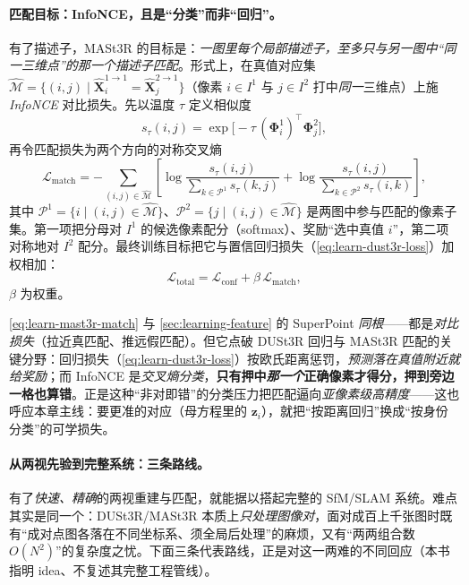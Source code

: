 \paragraph{匹配目标：InfoNCE，且是“分类”而非“回归”。}
有了描述子，MASt3R 的目标是：\emph{一图里每个局部描述子，至多只与另一图中“同一三维点”的那\emph{一个}描述子匹配}。形式上，在真值对应集 $\hat{\mathcal{M}}=\{(i,j)\mid \hat{\mathbf{X}}^{1\to1}_i=\hat{\mathbf{X}}^{2\to1}_j\}$（像素 $i\in I^1$ 与 $j\in I^2$ 打中\emph{同一}三维点）上施 \emph{InfoNCE} 对比损失。先以温度 $\tau$ 定义相似度
\begin{equation}
  s_\tau(i,j)=\exp\!\big[-\tau\,(\boldsymbol\Phi^1_i)^{\top}\boldsymbol\Phi^2_j\big],
  \label{eq:learn-mast3r-stau}
\end{equation}
再令匹配损失为两个方向的对称交叉熵
\begin{equation}
  \mathcal{L}_{\mathrm{match}}
  =-\!\!\sum_{(i,j)\in\hat{\mathcal{M}}}\!\!\left[
  \log\frac{s_\tau(i,j)}{\sum_{k\in\mathcal{P}^1}s_\tau(k,j)}
  +\log\frac{s_\tau(i,j)}{\sum_{k\in\mathcal{P}^2}s_\tau(i,k)}\right],
  \label{eq:learn-mast3r-match}
\end{equation}
其中 $\mathcal{P}^1=\{i\mid(i,j)\in\hat{\mathcal{M}}\}$、$\mathcal{P}^2=\{j\mid(i,j)\in\hat{\mathcal{M}}\}$ 是两图中参与匹配的像素子集。第一项把分母对 $I^1$ 的候选像素配分（softmax）、奖励“选中真值 $i$”，第二项对称地对 $I^2$ 配分。最终训练目标把它与置信回归损失（\cref{eq:learn-dust3r-loss}）加权相加：
\begin{equation}
  \mathcal{L}_{\mathrm{total}}=\mathcal{L}_{\mathrm{conf}}+\beta\,\mathcal{L}_{\mathrm{match}},
  \label{eq:learn-mast3r-total}
\end{equation}
$\beta$ 为权重。

\begin{insight}
\cref{eq:learn-mast3r-match} 与 \cref{sec:learning-feature} 的 SuperPoint \emph{同根}——都是\emph{对比损失}（拉近真匹配、推远假匹配）。但它点破 DUSt3R 回归与 MASt3R 匹配的关键分野：回归损失（\cref{eq:learn-dust3r-loss}）按欧氏距离惩罚，\emph{预测落在真值附近就给奖励}；而 InfoNCE 是\emph{交叉熵分类}，\textbf{只有押中\emph{那一个}正确像素才得分，押到旁边一格也算错}。正是这种“非对即错”的分类压力把匹配逼向\emph{亚像素级高精度}——这也呼应本章主线：要更准的对应（母方程里的 $\mathbf{z}_i$），就把“按距离回归”换成“按身份分类”的可学损失。
\end{insight}

\paragraph{从两视先验到完整系统：三条路线。}
有了\emph{快速、精确}的两视重建与匹配，就能据以搭起完整的 SfM/SLAM 系统。难点其实是同一个：DUSt3R/MASt3R 本质上\emph{只处理图像对}，面对成百上千张图时既有“成对点图各落在不同坐标系、须全局后处理”的麻烦，又有“两两组合数 $O(N^2)$”的复杂度之忧。下面三条代表路线，正是对这一两难的不同回应（本书指明 idea、不复述其完整工程管线\cite{leroy2024mast3r}）。

